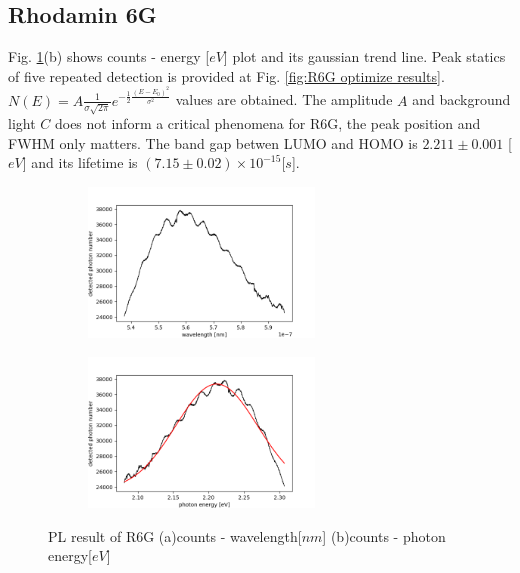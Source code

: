 \documentclass{article}
\begin{document}
\subsection{Rhodamin 6G}
 Fig. \ref{fig:R6G results}(b) shows counts - energy [$eV$] plot and its gaussian trend line.
 Peak statics of five repeated detection is provided at Fig. \ref{fig:R6G optimize results}.
 $N(E) = A \frac{1} {\sigma \sqrt{2\pi}} e^{-\frac{1}{2} \frac{(E-E_0)^2}{\sigma^2}}$ values are obtained.
 The amplitude $A$ and background light $C$ does not inform a critical phenomena for R6G, the peak position and FWHM only matters.
 The band gap betwen LUMO and HOMO is $2.211 \pm 0.001$ [$eV$] and its lifetime is $(7.15 \pm 0.02) \times 10^{-15} $[$s$].
 \begin{figure}[ht]
  \centering
  \begin{subfigure}[b]{6cm}
      \centering
      \includegraphics[width=6cm]{../results/R6G(1)_raw_fig.png}
      \caption{}
  \end{subfigure}
  \hfill
  \begin{subfigure}[b]{6cm}
      \centering
      \includegraphics[width=6cm]{../results/R6G(1)_gaussian_fitted_fig.png}
      \caption{}
  \end{subfigure}
  \hfill
  \caption{PL result of R6G (a)counts - wavelength[$nm$] (b)counts - photon energy[$eV$]}
  \label{fig:R6G results}
\end{figure}
\end{document}
